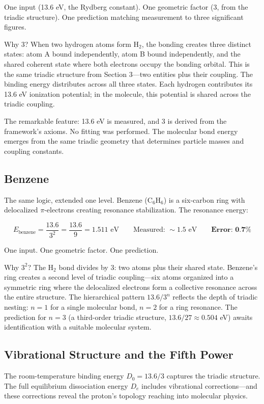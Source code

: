 \documentclass[12pt]{article}
\begin{document}
One input (13.6 eV, the Rydberg constant). One geometric factor (3, from the triadic structure). One prediction matching measurement to three significant figures.

Why 3? When two hydrogen atoms form H$_2$, the bonding creates three distinct states: atom A bound independently, atom B bound independently, and the shared coherent state where both electrons occupy the bonding orbital. This is the same triadic structure from Section 3---two entities plus their coupling. The binding energy distributes across all three states. Each hydrogen contributes its 13.6 eV ionization potential; in the molecule, this potential is shared across the triadic coupling.

The remarkable feature: 13.6 eV is measured, and 3 is derived from the framework's axioms. No fitting was performed. The molecular bond energy emerges from the same triadic geometry that determines particle masses and coupling constants.
\subsection{Benzene}

The same logic, extended one level. Benzene (C$_6$H$_6$) is a six-carbon ring with delocalized $\pi$-electrons creating resonance stabilization. The resonance energy:

$$E_{\text{benzene}} = \frac{13.6}{3^2} = \frac{13.6}{9} = 1.511 \text{ eV} \qquad \text{Measured: } \sim 1.5 \text{ eV} \qquad \textbf{Error: 0.7\%}$$

One input. One geometric factor. One prediction.

Why $3^2$? The H$_2$ bond divides by 3: two atoms plus their shared state. Benzene's ring creates a second level of triadic coupling---six atoms organized into a symmetric ring where the delocalized electrons form a collective resonance across the entire structure. The hierarchical pattern $13.6/3^n$ reflects the depth of triadic nesting: $n = 1$ for a single molecular bond, $n = 2$ for a ring resonance. The prediction for $n = 3$ (a third-order triadic structure, $13.6/27 \approx 0.504$ eV) awaits identification with a suitable molecular system.

\subsection{Vibrational Structure and the Fifth Power}

The room-temperature binding energy $D_0 = 13.6/3$ captures the triadic structure. The full equilibrium dissociation energy $D_e$ includes vibrational corrections---and these corrections reveal the proton's topology reaching into molecular physics.
\end{document}
